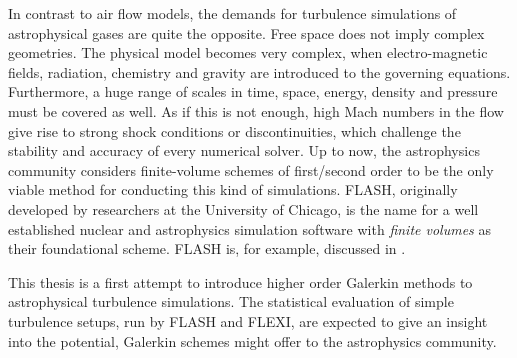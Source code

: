 In contrast to air flow models, the demands for turbulence simulations of
astrophysical gases are quite the opposite. Free space does not imply complex
geometries. The physical model becomes very complex, when electro-magnetic
fields, radiation, chemistry and gravity are introduced to the governing
equations.  Furthermore, a huge range of scales in time, space, energy, density
and pressure must be covered as well. As if this is not enough, high Mach
numbers in the flow give rise to strong shock conditions or discontinuities,
which challenge the stability and accuracy of every numerical solver. Up to
now, the astrophysics community considers finite-volume schemes of first/second
order to be the only viable method for conducting this kind of simulations.
FLASH\footnotemark[2], originally developed by researchers at the University of
Chicago, is the name for a well established nuclear and astrophysics simulation
software with \emph{finite volumes} as their foundational scheme. FLASH is, for
example, discussed in \cite{fryxell2001adaptive,lee2011progress,walch2015silcc}.

This thesis is a first attempt to introduce higher order Galerkin methods to
astrophysical turbulence simulations. The statistical evaluation of simple
turbulence setups, run by FLASH and FLEXI, are expected to give an insight into
the potential, Galerkin schemes might offer to the astrophysics community.


\newpage
